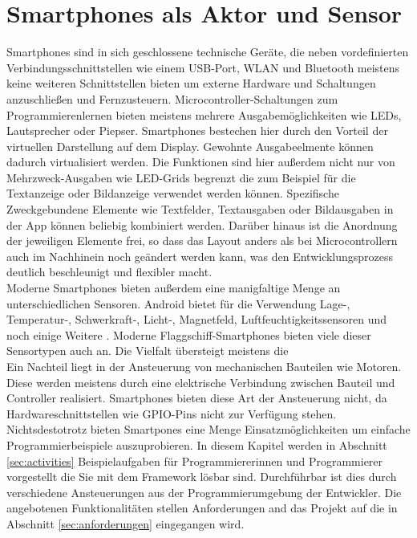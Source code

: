 \documentclass[11pt,a4paper]{report}
\begin{document}
\chapter{Smartphones als Aktor und Sensor} \label{chap:Experimente}
Smartphones sind in sich geschlossene technische Geräte, die neben vordefinierten Verbindungsschnittstellen wie einem USB-Port, WLAN und Bluetooth meistens keine weiteren Schnittstellen bieten um externe Hardware und Schaltungen anzuschließen und Fernzusteuern.
Microcontroller-Schaltungen zum Programmierenlernen bieten meistens mehrere Ausgabemöglichkeiten wie LEDs, Lautsprecher oder Piepser.
Smartphones bestechen hier durch den Vorteil der virtuellen Darstellung auf dem Display.
Gewohnte Ausgabeelmente können dadurch virtualisiert werden.
Die Funktionen sind hier außerdem nicht nur von Mehrzweck-Ausgaben wie LED-Grids begrenzt die zum Beispiel für die Textanzeige oder Bildanzeige verwendet werden können.
Spezifische Zweckgebundene Elemente wie Textfelder, Textausgaben oder Bildausgaben in der App können beliebig kombiniert werden.
Darüber hinaus ist die Anordnung der jeweiligen Elemente frei, so dass das Layout anders als bei Microcontrollern auch im Nachhinein noch geändert werden kann, was den Entwicklungsprozess deutlich beschleunigt und flexibler macht.
\\
Moderne Smartphones bieten außerdem eine manigfaltige Menge an unterschiedlichen Sensoren.
Android bietet für die Verwendung Lage-, Temperatur-, Schwerkraft-, Licht-, Magnetfeld, Luftfeuchtigkeitssensoren und noch einige Weitere \cite{sensoren_android}.
Moderne Flaggschiff-Smartphones bieten viele dieser Sensortypen auch an.
Die Vielfalt übersteigt meistens die 
\\
Ein Nachteil liegt in der Ansteuerung von mechanischen Bauteilen wie Motoren.
Diese werden meistens durch eine elektrische Verbindung zwischen Bauteil und Controller realisiert.
Smartphones bieten diese Art der Ansteuerung nicht, da Hardwareschnittstellen wie GPIO-Pins nicht zur Verfügung stehen.
\\
Nichtsdestotrotz bieten Smartpones eine Menge Einsatzmöglichkeiten um einfache Programmierbeispiele auszuprobieren.
In diesem Kapitel werden in Abschnitt \ref{sec:activities} Beispielaufgaben für Programmiererinnen und Programmierer vorgestellt die Sie mit dem Framework lösbar sind.
Durchführbar ist dies durch verschiedene Ansteuerungen aus der Programmierumgebung der Entwickler.
Die angebotenen Funktionalitäten stellen Anforderungen and das Projekt auf die in Abschnitt \ref{sec:anforderungen} eingegangen wird.
\end{document}
